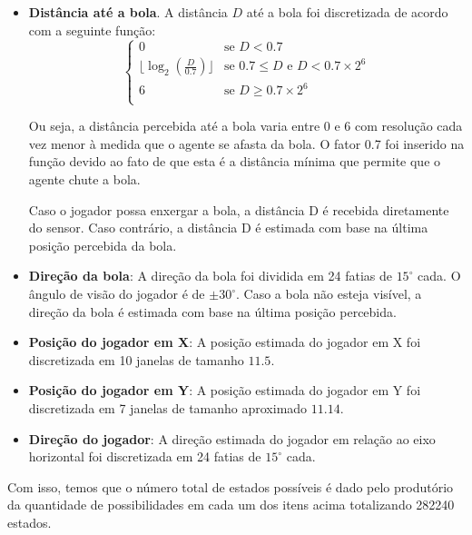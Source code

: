 \begin{itemize}
	\item \textbf{Distância até a bola}. A distância $D$ até a bola foi discretizada de acordo com a seguinte função:
	\begin{equation}
		\label{eq:balldist}
		\left\{
		\begin{array}{ll}
			0  & \mbox{se } D < 0.7 \\
			\lfloor\log_2 (\frac{D}{0.7})\rfloor & \mbox{se } 0.7 \leq D \mbox{ e } D < 0.7 \times 2^6 \\
			6  & \mbox{se } D \geq 0.7 \times 2^6 \\
			
		\end{array}
		\right.
	\end{equation}
	
	Ou seja, a distância percebida até a bola varia entre 0 e 6 com resolução cada vez menor à medida que o agente se afasta da bola. O fator 0.7 foi inserido na função devido ao fato de que esta é a distância mínima que permite que o agente chute a bola.
	
	Caso o jogador possa enxergar a bola, a distância D é recebida diretamente do sensor. Caso contrário, a distância D é estimada com base na última posição percebida da bola.
	
	\item \textbf{Direção da bola}: A direção da bola foi dividida em 24 fatias de $15^{\circ}$ cada. O ângulo de visão do jogador é de $\pm30^{\circ}$. Caso a bola não esteja visível, a direção da bola é estimada com base na última posição percebida.
	
	\item \textbf{Posição do jogador em X}: A posição estimada do jogador em X foi discretizada em 10 janelas de tamanho $11.5$.
	
	\item \textbf{Posição do jogador em Y}: A posição estimada do jogador em Y foi discretizada em 7 janelas de tamanho aproximado $11.14$.
	
	\item \textbf{Direção do jogador}: A direção estimada do jogador em relação ao eixo horizontal foi discretizada em 24 fatias de $15^{\circ}$ cada.
	
\end{itemize}

Com isso, temos que o número total de estados possíveis é dado pelo produtório da quantidade de possibilidades em cada um dos itens acima totalizando 282240 estados.

